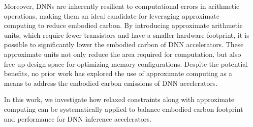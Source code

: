 Moreover, DNNs are inherently resilient to computational errors in arithmetic operations, making them an ideal candidate for leveraging approximate computing to reduce embodied carbon. By introducing approximate arithmetic units, which require fewer transistors and have a smaller hardware footprint, it is possible to significantly lower the embodied carbon of DNN accelerators. These approximate units not only reduce the area required for computation, but also free up design space for optimizing memory configurations. Despite the potential benefits, no prior work has explored the use of approximate computing as a means to address the embodied carbon emissions of DNN accelerators. 

In this work, we investigate how relaxed constraints along with approximate computing can be systematically applied to balance embodied carbon footprint and performance for DNN inference accelerators.